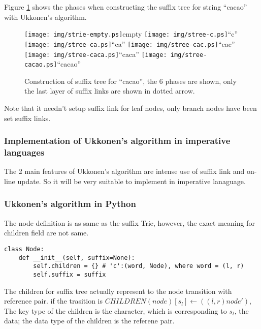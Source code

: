 \documentclass{article}
\begin{document}
Figure \ref{fig:cons-stree-cacao} shows the phases when constructing the
suffix tree for string ``cacao'' with Ukkonen's algorithm.

\begin{figure}[htbp]
   \begin{center}
     \texttt{[image: img/strie-empty.ps]}empty
     \texttt{[image: img/stree-c.ps]}``c''
     \texttt{[image: img/stree-ca.ps]}``ca''
     \texttt{[image: img/stree-cac.ps]}``cac'' \newline
     \texttt{[image: img/stree-caca.ps]}``caca''
     \texttt{[image: img/stree-cacao.ps]}``cacao''
     \caption{Construction of suffix tree for ``cacao'', the 6 phases are shown, only the last layer of suffix links are shown in dotted arrow.}
     \label{fig:cons-stree-cacao}
   \end{center}
\end{figure}

Note that it needn't setup suffix link for leaf nodes, only branch nodes
have been set suffix links.

\subsubsection{Implementation of Ukkonen's algorithm in imperative languages}
The 2 main features of Ukkonen's algorithm are intense use of suffix link and
on-line update. So it will be very suitable to implement in imperative lanaguage.

\subsubsection*{Ukkonen's algorithm in Python}
The node definition is as same as the suffix Trie, however, the exact meaning
for children field are not same.

\lstset{language=Python}
\begin{lstlisting}
class Node:
    def __init__(self, suffix=None):
        self.children = {} # 'c':(word, Node), where word = (l, r)
        self.suffix = suffix
\end{lstlisting}

The children for suffix tree actually represent to the node transition
with reference pair. if the trasition is 
$CHILDREN(node)[s_l] \leftarrow ((l, r) node')$, 
The key type of the children is the character, which is corresponding 
to $s_l$, the data; the data type of the children is the referene pair.
\end{document}
